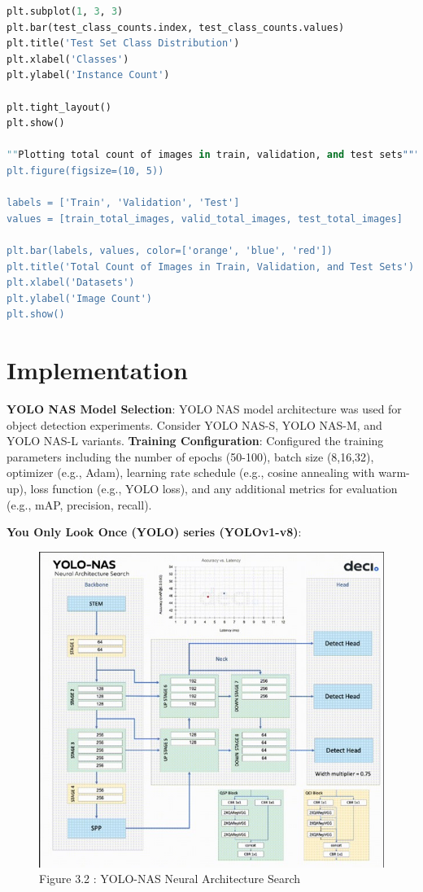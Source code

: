 \begin{lstlisting}[language=Python, caption={Code snippet in \LaTeX ~and  this is a Python code }, label=list:python_code_ex]
plt.subplot(1, 3, 3)
plt.bar(test_class_counts.index, test_class_counts.values)
plt.title('Test Set Class Distribution')
plt.xlabel('Classes')
plt.ylabel('Instance Count')

plt.tight_layout()
plt.show()

""Plotting total count of images in train, validation, and test sets"""
plt.figure(figsize=(10, 5))

labels = ['Train', 'Validation', 'Test']
values = [train_total_images, valid_total_images, test_total_images]

plt.bar(labels, values, color=['orange', 'blue', 'red'])
plt.title('Total Count of Images in Train, Validation, and Test Sets')
plt.xlabel('Datasets')
plt.ylabel('Image Count')
plt.show()

\end{lstlisting}

\section{Implementation}
\textbf{YOLO NAS Model Selection}: YOLO NAS model architecture was used for object detection experiments. Consider YOLO NAS-S, YOLO NAS-M, and YOLO NAS-L variants.
\textbf{Training Configuration}: Configured the training parameters including the number of epochs (50-100), batch size (8,16,32), optimizer (e.g., Adam), learning rate schedule (e.g., cosine annealing with warm-up), loss function (e.g., YOLO loss), and any additional metrics for evaluation (e.g., mAP, precision, recall).

\textbf{You Only Look Once (YOLO) series (YOLOv1-v8)}:
\begin{figure}[ht]
    \centering
    \includegraphics[scale=1.0]{figures/YOLO-NAS Neural Architecture Search.jpg}
    \caption{Figure 3.2 : YOLO-NAS Neural Architecture Search}
    \label{fig:example-01}
\end{figure}


